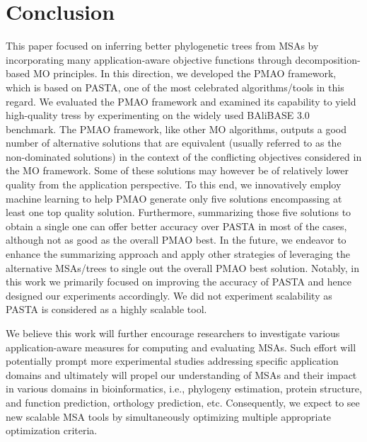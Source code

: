 \section{Conclusion}
This paper focused on inferring better phylogenetic trees from MSAs by incorporating many application-aware objective functions through decomposition-based MO principles. In this direction, we developed the PMAO framework, which is based on PASTA, one of the most celebrated algorithms/tools in this regard. We evaluated the PMAO framework and examined its capability to yield high-quality tress by experimenting on the widely used BAliBASE 3.0 benchmark. The PMAO framework, like other MO algorithms, outputs a good number of alternative solutions that are equivalent (usually referred to as the non-dominated solutions) in the context of the conflicting objectives considered in the MO framework. Some of these solutions may however be of relatively lower quality from the application perspective. To this end, we innovatively employ machine learning to help PMAO generate only five solutions encompassing at least one top quality solution. Furthermore, summarizing those five solutions to obtain a single one can offer better accuracy over PASTA in most of the cases, although not as good as the overall PMAO best. In the future, we endeavor to enhance the summarizing approach and apply other strategies of leveraging the alternative MSAs/trees to single out the overall PMAO best solution.
Notably, in this work we primarily focused on improving the accuracy of PASTA and hence designed our experiments accordingly. We did not experiment scalability as PASTA is considered as a highly scalable tool.

We believe this work will further encourage researchers to investigate various application-aware measures for computing and evaluating MSAs. Such effort will potentially prompt more experimental studies addressing specific application domains and ultimately will propel our understanding of MSAs and their impact in various domains in bioinformatics, i.e., phylogeny estimation, protein structure, and function prediction, orthology prediction, etc. Consequently, we expect to see new scalable MSA tools by simultaneously optimizing multiple appropriate optimization criteria.
